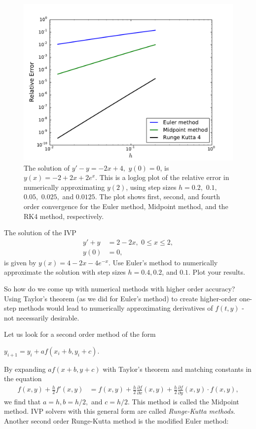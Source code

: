 \begin{figure}[ht]
\centering
\includegraphics[width=\textwidth]{Fig3.pdf}
\caption{The solution of $y' -y= -2x+4,$ $ y(0) = 0$, is $y(x) = -2+2x + 2e^x.$ This is a loglog plot of the relative error in numerically approximating $y(2)$, using step sizes $h = 0.2,$ $0.1,$ $0.05,$ $0.025,$ and $0.0125$. The plot shows first, second, and fourth order convergence for the Euler method, Midpoint method, and the RK4 method, respectively.}
\label{ivp:relative_error}
\end{figure}

\begin{problem} The solution of the IVP
\begin{align*}
y' + y &= 2-2x,\,\, 0 \leq x \leq 2, \\
y(0) &= 0,
\end{align*}
is given by $y(x) = 4-2x -4e^{-x}$.
Use Euler's method to numerically approximate the solution with step sizes $h = 0.4, 0.2$, and $0.1.$ Plot your results.
\end{problem}

So how do we come up with numerical methods with higher order accuracy? Using Taylor's theorem (as we did for Euler's method) to create higher-order one-step methods would lead to numerically approximating derivatives of $f(t,y)$ - not necessarily desirable.

Let us look for a second order method of the form

$y_{i+1} = y_i + a f(x_i+b, y_i+c).$

By expanding $a f(x+b, y+c)$ with Taylor's theorem and matching constants in the equation
\begin{align*}
f(x,y) + \frac{h}{2}f'(x,y) &= f(x,y) + \frac{h}{2}\frac{\partial f}{\partial x}(x,y) + \frac{h}{2}\frac{\partial f}{\partial y}(x,y) \cdot f(x,y),
\end{align*}
we find that $a = h, b = h/2,$ and $c = h/2$. This method is called the Midpoint method. IVP solvers with this general form are called \textit{Runge-Kutta methods}. Another second order Runge-Kutta method is the modified Euler method:

